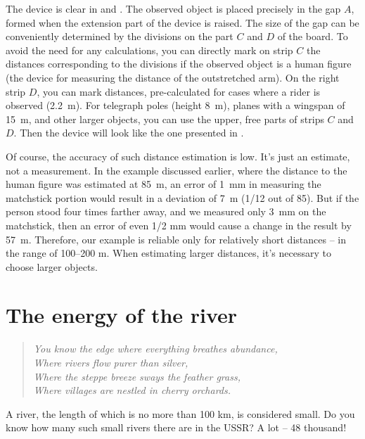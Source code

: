 The device is clear in  and . The observed object is placed precisely in the gap $A$, formed when the extension part of the device is raised. The size of the gap can be conveniently determined by the divisions on the part $C$ and $D$ of the board. To avoid the need for any calculations, you can directly mark on strip $C$ the distances corresponding to the divisions if the observed object is a human figure (the device for measuring the distance of the outstretched arm). On the right strip $D$, you can mark distances, pre-calculated for cases where a rider is observed (\SI{2.2}{\meter}). For telegraph poles (height \SI{8}{\meter}), planes with a wingspan of \SI{15}{\meter}, and other larger objects, you can use the upper, free parts of strips $C$ and $D.$ Then the device will look like the one presented in .





Of course, the accuracy of such distance estimation is low. It's just an estimate, not a measurement. In the example discussed earlier, where the distance to the human figure was estimated at \SI{85}{\meter}, an error of \SI{1}{\milli\meter} in measuring the matchstick portion would result in a deviation of \SI{7}{\meter} (1/12 out of 85). But if the person stood four times farther away, and we measured only \SI{3}{\milli\meter} on the matchstick, then an error of even 1/2 mm would cause a change in the result by \SI{57}{\meter}. Therefore, our example is reliable only for relatively short distances -- in the range of 100--200 m. When estimating larger distances, it's necessary to choose larger objects.


\section{The energy of the river}
\label{sec-2.6}

\begin{quote}
\emph{You know the edge where everything breathes abundance,\\
Where rivers flow purer than silver, \\
Where the steppe breeze sways the feather grass, \\
Where villages are nestled in cherry orchards.}\\[-10pt]
\end{quote}


A river, the length of which is no more than 100 km, is considered small. Do you know how many such small rivers there are in the USSR? A lot -- 48 thousand!

